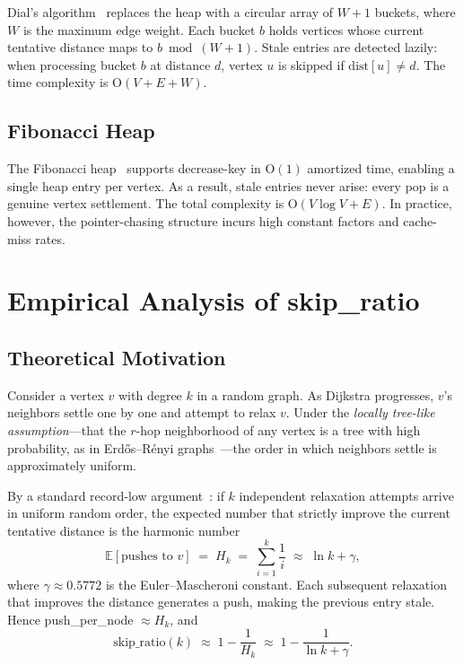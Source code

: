 \documentclass[conference]{IEEEtran}
\begin{document}
Dial's algorithm~\cite{dial1969} replaces the heap with a circular array
of $W+1$ buckets, where $W$ is the maximum edge weight.  Each bucket $b$
holds vertices whose current tentative distance maps to $b \bmod (W+1)$.
Stale entries are detected lazily: when processing bucket $b$ at distance
$d$, vertex $u$ is skipped if $\mathrm{dist}[u]\neq d$.  The time
complexity is O$(V + E + W)$.

\subsection{Fibonacci Heap}

The Fibonacci heap~\cite{fredman1987} supports decrease-key in O$(1)$
amortized time, enabling a single heap entry per vertex.  As a result,
stale entries never arise: every pop is a genuine vertex settlement.
The total complexity is O$(V\log V + E)$.  In practice, however, the
pointer-chasing structure incurs high constant factors and cache-miss rates.

\section{Empirical Analysis of skip\_ratio}
\label{sec:analysis}

\subsection{Theoretical Motivation}

Consider a vertex $v$ with degree $k$ in a random graph.  As Dijkstra
progresses, $v$'s neighbors settle one by one and attempt to relax $v$.
Under the \emph{locally tree-like assumption}---that the $r$-hop
neighborhood of any vertex is a tree with high probability, as in
Erd\H{o}s--R\'enyi graphs~\cite{bollobas2001}---the order in which neighbors
settle is approximately uniform.

By a standard record-low argument~\cite{flajolet2009analytic}: if $k$
independent relaxation attempts arrive in uniform random order, the
expected number that strictly improve the current tentative distance is the
harmonic number
\[
  \mathbb{E}[\text{pushes to }v] \;=\; H_k
    \;=\; \sum_{i=1}^{k}\frac{1}{i}
    \;\approx\; \ln k + \gamma,
\]
where $\gamma\approx 0.5772$ is the Euler--Mascheroni constant.
Each subsequent relaxation that improves the distance generates a push,
making the previous entry stale.  Hence push\_per\_node $\approx H_k$, and
\[
  \text{skip\_ratio}(k)
    \;\approx\; 1 - \frac{1}{H_k}
    \;\approx\; 1 - \frac{1}{\ln k + \gamma}.
\]
\end{document}
